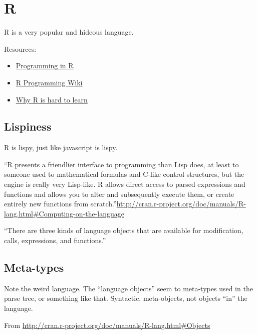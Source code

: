 \chapter{R}

R is a very popular and hideous language.

Resources:

\begin{itemize}
\item \href{http://manuals.bioinformatics.ucr.edu/home/programming-in-r}{Programming in R}
\item \href{http://en.wikibooks.org/wiki/R_Programming}{R Programming Wiki}
\item \href{http://r4stats.com/2012/06/13/why-r-is-hard-to-learn/}{Why R is hard to learn}
\end{itemize}

\section{Lispiness}
\label{sect:rlispiness}

R is lispy, just like javascript is lispy.

``R presents a friendlier interface to programming than Lisp does, at least to someone used to mathematical formulas and C-like control structures, but the engine is really very Lisp-like. R allows direct access to parsed expressions and functions and allows you to alter and subsequently execute them, or create entirely new functions from scratch.''\url{http://cran.r-project.org/doc/manuals/R-lang.html#Computing-on-the-language}

``There are three kinds of language objects that are available for modification, calls, expressions, and functions.''

\section{Meta-types}
\label{sect:rmetatypes}

\begin{ednote}
  Note the weird language.  The ``language objects'' seem to
  meta-types used in the parse tree, or something like that.
  Syntactic, meta-objects, not objects ``in'' the language.
\end{ednote}

From \url{http://cran.r-project.org/doc/manuals/R-lang.html#Objects}

